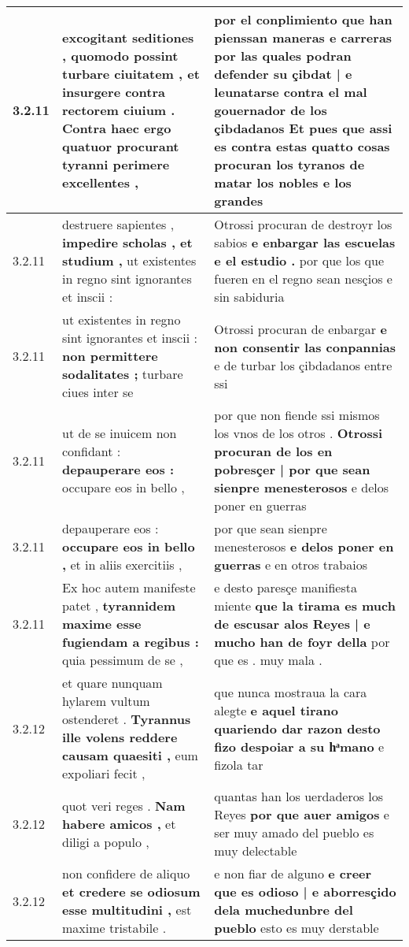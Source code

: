 \begin{tabular}{|p{1cm}|p{6.5cm}|p{6.5cm}|}
3.2.11 & excogitant seditiones , \textbf{ quomodo possint turbare ciuitatem , et insurgere contra rectorem ciuium . } Contra haec ergo quatuor procurant tyranni perimere excellentes , & por el conplimiento que han pienssan maneras e carreras \textbf{ por las quales podran defender su çibdat | e leunatarse contra el mal gouernador de los çibdadanos } Et pues que assi es contra estas quatto cosas procuran los tyranos de matar los nobles e los grandes \\\hline
3.2.11 & destruere sapientes , \textbf{ impedire scholas , et studium , } ut existentes in regno sint ignorantes et inscii : & Otrossi procuran de destroyr los sabios \textbf{ e enbargar las escuelas e el estudio . } por que los que fueren en el regno sean nesçios e sin sabiduria \\\hline
3.2.11 & ut existentes in regno sint ignorantes et inscii : \textbf{ non permittere sodalitates ; } turbare ciues inter se & Otrossi procuran de enbargar \textbf{ e non consentir las conpannias } e de turbar los çibdadanos entre ssi \\\hline
3.2.11 & ut de se inuicem non confidant : \textbf{ depauperare eos : } occupare eos in bello , & por que non fiende ssi mismos los vnos de los otros . \textbf{ Otrossi procuran de los en pobresçer | por que sean sienpre menesterosos } e delos poner en guerras \\\hline
3.2.11 & depauperare eos : \textbf{ occupare eos in bello , } et in aliis exercitiis , & por que sean sienpre menesterosos \textbf{ e delos poner en guerras } e en otros trabaios \\\hline
3.2.11 & Ex hoc autem manifeste patet , \textbf{ tyrannidem maxime esse fugiendam a regibus : } quia pessimum de se , & e desto paresçe manifiesta miente \textbf{ que la tirama es much de escusar alos Reyes | e mucho han de foyr della } por que es . muy mala . \\\hline
3.2.12 & et quare nunquam hylarem vultum ostenderet . \textbf{ Tyrannus ille volens reddere causam quaesiti , } eum expoliari fecit , & que nunca mostraua la cara alegte \textbf{ e aquel tirano quariendo dar razon desto fizo despoiar a su hͣmano } e fizola tar \\\hline
3.2.12 & quot veri reges . \textbf{ Nam habere amicos , } et diligi a populo , & quantas han los uerdaderos los Reyes \textbf{ por que auer amigos } e ser muy amado del pueblo es muy delectable \\\hline
3.2.12 & non confidere de aliquo \textbf{ et credere se odiosum esse multitudini , } est maxime tristabile . & e non fiar de alguno \textbf{ e creer que es odioso | e aborresçido dela muchedunbre del pueblo } esto es muy derstable \\\hline

\end{tabular}
